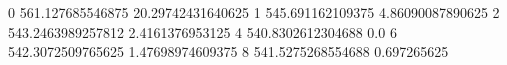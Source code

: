 0 561.127685546875 20.29742431640625
1 545.691162109375 4.86090087890625
2 543.2463989257812 2.4161376953125
4 540.8302612304688 0.0
6 542.3072509765625 1.47698974609375
8 541.5275268554688 0.697265625
